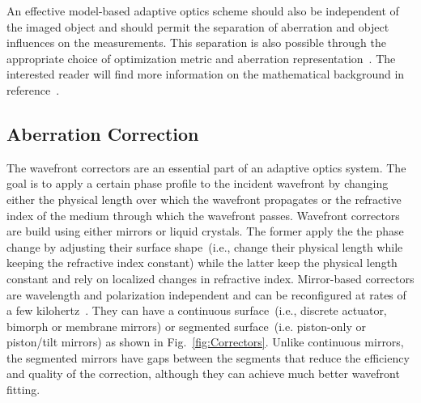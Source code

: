 An effective model-based adaptive optics scheme should also be independent of the imaged object and should permit the separation of aberration and object influences on the measurements. This separation is also possible through the appropriate choice of optimization metric and aberration representation~\cite{wide_AOM_loew_freq}. The interested reader will find more information on the mathematical background in reference~\cite{wide_parabolic_optimization,wide_sphere_packing,wide_Lukosz_Modes,wide_AOM_loew_freq}. 


\subsection{Aberration Correction}
\label{sec:AberrationCorrection}

The wavefront correctors are an essential part of an adaptive optics system. The goal is to apply a certain phase profile to the incident wavefront by changing either the physical length over which the wavefront propagates or the refractive index of the medium through which the wavefront passes. Wavefront correctors are build using either mirrors or liquid crystals. The former apply the the phase change by adjusting their surface shape~(i.e., change their physical length while keeping the refractive index constant) while the latter keep the physical length constant and rely on localized changes in refractive index.  Mirror-based correctors are wavelength and polarization independent and can be reconfigured at rates of a few kilohertz~\cite{AOM_basic_ref}. They can have a continuous surface~(i.e., discrete actuator, bimorph or membrane mirrors) or segmented surface~(i.e. piston-only or piston/tilt mirrors) as shown in Fig.~\ref{fig:Correctors}. Unlike continuous mirrors, the segmented mirrors have gaps between the segments that reduce the efficiency and quality of the correction, although they can achieve much better wavefront fitting. 

